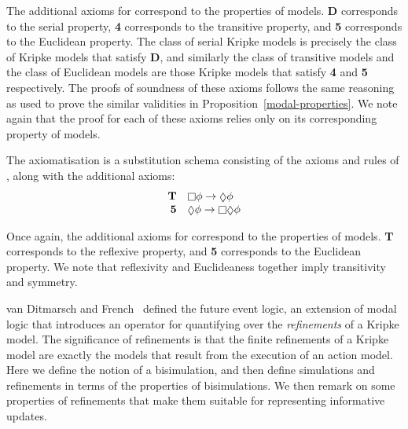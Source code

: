 The additional axioms for \axiomKD{} correspond to the properties of \classKD{}
models. {\bf D} corresponds to the serial property, {\bf 4} corresponds to the
transitive property, and {\bf 5} corresponds to the Euclidean property. The
class of serial Kripke models is precisely the class of Kripke models that
satisfy {\bf D}, and similarly the class of transitive models and the class of
Euclidean models are those Kripke models that satisfy {\bf 4} and {\bf 5}
respectively. The proofs of soundness of these axioms follows the same reasoning
as used to prove the similar validities in Proposition~\ref{modal-properties}.
We note again that the proof for each of these axioms relies only on its
corresponding property of \classKD{} models.


\begin{definition}
The axiomatisation \axiomS{} is a substitution schema consisting of the axioms
and rules of \axiomK{}, along with the additional axioms:
$$
\begin{array}{rl}
{\bf T} & \knows \phi \implies \suspects \phi\\
{\bf 5} & \suspects \phi \implies \knows \suspects \phi\\
\end{array}
$$
\end{definition}

Once again, the additional axioms for \axiomS{} correspond to the properties of
\classS{} models. {\bf T} corresponds to the reflexive property, and {\bf 5}
corresponds to the Euclidean property. We note that reflexivity and Euclideaness
together imply transitivity and symmetry.

van Ditmarsch and French~\cite{french2010future} defined the future event logic,
an extension of modal logic that introduces an operator for quantifying over the
{\em refinements} of a Kripke model. The significance of refinements is that the
finite refinements of a Kripke model are exactly the models that result from the
execution of an action model. Here we define the notion of a bisimulation, and
then define simulations and refinements in terms of the properties of
bisimulations. We then remark on some properties of refinements that make them
suitable for representing informative updates.

